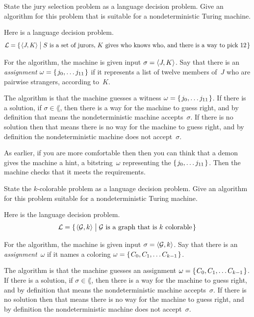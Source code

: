 \documentclass[answers, nolegalese, 11pt]{examjh}
\begin{document}
\begin{questions}
\question
State the  jury selection problem as a language decision problem.
Give an algorithm for this problem that is 
suitable for a nondeterministic Turing machine.
\begin{solution}
Here is a language decision problem.
\begin{equation*}
  \lang=\set{\sequence{J,K}\suchthat 
           \text{$S$ is a set of jurors, $K$ gives who knows who, and there is a way to pick~$12$}}
\end{equation*}

For the algorithm, the machine is given input $\sigma=\langle J,K\rangle$.
Say that there is an \textit{assignment} $\omega=\set{j_0,\ldots{} j_{11}}$
if it represents a list of twelve members of~$J$ who are pairwise strangers, 
according to~$K$.

The algorithm is that the machine guesses a witness 
$\omega=\set{j_0,\ldots{} j_{11}}$.
If there is a solution, if $\sigma\in \lang$, 
then there is a way for the machine to guess right,
and by definition that means the nondeterministic machine accepts~$\sigma$.
If there is no solution then that means there is no way for the machine
to guess right, and by definition the nondeterministic machine does
not accept~$\sigma$.

As earlier, if you are more comfortable then
then you can think that a demon
gives the machine a hint, a bitstring~$\omega$ representing
the $\set{j_0,\ldots{} j_{11}}$.  
Then the machine checks that it meets the requirements.
\end{solution}

\question
State the $k$-colorable problem as a language decision problem.
Give an algorithm for this problem
suitable for a nondeterministic Turing machine.
\begin{solution}
Here is the language decision problem.
\begin{equation*}
  \lang=\set{\sequence{\mathcal{G},k}\suchthat 
           \text{$\mathcal{G}$ is a graph that is $k$ colorable}}
\end{equation*}

For the algorithm, the machine is given input $\sigma=\langle\mathcal{G},k\rangle$.
Say that there is an \textit{assignment}~$\omega$
if it names a coloring 
$\omega=\set{C_0,C_1,\ldots C_{k-1}}$.

The algorithm is that the machine guesses an assignment
$\omega=\set{C_0,C_1,\ldots C_{k-1}}$.
If there is a solution, if $\sigma\in \lang$, 
then there is a way for the machine to guess right,
and by definition that means the nondeterministic machine accepts~$\sigma$.
If there is no solution then that means there is no way for the machine
to guess right, and by definition the nondeterministic machine does
not accept~$\sigma$.
\end{solution}


\end{questions}
\end{document}
